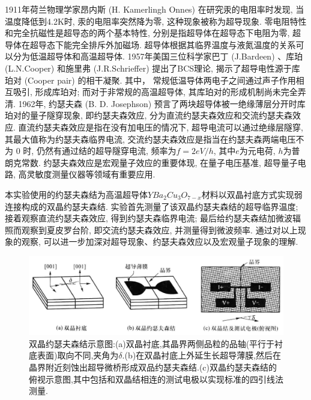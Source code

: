 \documentclass[font=default]{mpltx}
\newcommand{\note}[1]{{\color{gray}#1}}
\newcommand*\cs[1]{\texttt{\textbackslash #1}}
\begin{document}
  1911年荷兰物理学家昂内斯 (H. Kamerlingh Onnes) 在研究汞的电阻率时发现, 当温度降低到4.2K时, 汞的电阻率突然降为零, 这种现象被称为超导现象.
  零电阻特性和完全抗磁性是超导态的两个基本特性, 分别是指超导体在超导态下电阻为零, 超导体在超导态下能完全排斥外加磁场.
  超导体根据其临界温度与液氮温度的关系可以分为低温超导体和高温超导体. 
  1957年美国三位科学家巴丁 (J.Bardeen) 、库珀 (L.N.Cooper) 和施里弗 (J.R.Schrieffer) 提出了BCS理论, 揭示了超导电性源于库珀对 (Cooper pair) 的相干凝聚.
  其中， 常规低温导体两电子之间通过声子作用相互吸引, 形成库珀对; 而对于非常规的高温超导体, 其库珀对的形成机制尚未完全弄清.
  1962年, 约瑟夫森 (B. D. Josephson) 预言了两块超导体被一绝缘薄层分开时库珀对的量子隧穿现象, 即约瑟夫森效应, 分为直流约瑟夫森效应和交流约瑟夫森效应.
  直流约瑟夫森效应是指在没有加电压的情况下, 超导电流可以通过绝缘层隧穿, 其最大值称为约瑟夫森临界电流, 交流约瑟夫森效应是指当在约瑟夫森两端电压不为 0 时, 仍然有通过结的超导隧穿电流, 频率为$f=2eV/h$, 其中$e$为元电荷, $h$为普朗克常数.
  约瑟夫森效应是宏观量子效应的重要体现, 在量子电压基准, 超导量子电路, 高灵敏度测量仪器等领域有重要应用\cite{jindaiwulishiyan}.
  \par 本实验使用的约瑟夫森结为高温超导体$YBa_2Cu_3O_{7-x}$材料以双晶衬底方式实现弱连接构成的双晶约瑟夫森结. 实验首先测量了该双晶约瑟夫森结的超导临界温度; 接着观察直流约瑟夫森效应, 得到约瑟夫森临界电流; 最后给约瑟夫森结加微波辐照而观察到夏皮罗台阶, 即交流约瑟夫森效应, 并测量得到微波频率.
  通过对以上现象的观察, 可以进一步加深对超导现象、约瑟夫森效应以及宏观量子现象的理解.
  \begin{figure}[htbp]
    \centering
    \includegraphics[width=0.85\linewidth]{fig/2.png}
    \caption{双晶约瑟夫森结示意图:(a)双晶衬底,其晶界两侧品粒的品轴(平行于衬底表面)取向不同,夹角为$\delta$.(b)在双晶衬底上外延生长超导薄膜,然后在晶界附近刻蚀出超导微桥形成双品约瑟夫森结.(c)双晶约瑟夫森结的俯视示意图,其中包括和双晶结相连的测试电极以实现标准的四引线法测量.
      }

    \label{fig:shuangjinjie}
  \end{figure}
\end{document}
